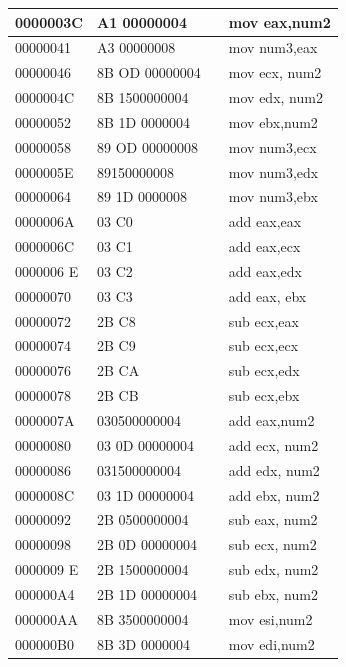 \documentclass[10pt]{book}
\begin{document}
\begin{center}
\begin{tabular}{|l|l|l|l|}
\hline
0000003C & A1 00000004 &  & mov eax,num2 \\
\hline
00000041 & A3 00000008 &  & mov num3,eax \\

\hline
00000046 & 8B OD 00000004 &  & mov ecx, num2 \\
\hline
0000004C & 8B 1500000004 &  & mov edx, num2 \\
\hline
00000052 & 8B 1D 0000004 &  & mov ebx,num2 \\
\hline
00000058 & 89 OD 00000008 &  & mov num3,ecx \\
\hline
0000005E & 89150000008 &  & mov num3,edx \\
\hline
00000064 & 89 1D 0000008 &  & mov num3,ebx \\
\hline
0000006A & 03 C0 &  & add eax,eax \\
\hline
0000006C & 03 C1 &  & add eax,ecx \\
\hline
0000006 E & 03 C2 &  & add eax,edx \\
\hline
00000070 & 03 C3 &  & add eax, ebx \\
\hline
00000072 & 2B C8 &  & sub ecx,eax \\
\hline
00000074 & 2B C9 &  & sub ecx,ecx \\
\hline
00000076 & 2B CA &  & sub ecx,edx \\
\hline
00000078 & 2B CB &  & sub ecx,ebx \\
\hline
0000007A & 030500000004 &  & add eax,num2 \\
\hline
00000080 & 03 0D 00000004 &  & add ecx, num2 \\
\hline
00000086 & 031500000004 &  & add edx, num2 \\
\hline
0000008C & 03 1D 00000004 &  & add ebx, num2 \\
\hline
00000092 & 2B 0500000004 &  & sub eax, num2 \\
\hline
00000098 & 2B 0D 00000004 &  & sub ecx, num2 \\
\hline
0000009 E & 2B 1500000004 &  & sub edx, num2 \\
\hline
000000A4 & 2B 1D 00000004 &  & sub ebx, num2 \\
\hline
000000AA & 8B 3500000004 &  & mov esi,num2 \\
\hline\index{Binary numbers}\index{Number systems}
000000B0 & 8B 3D 0000004 &  & mov edi,num2 \\

\end{tabular}
\end{center}
\end{document}
